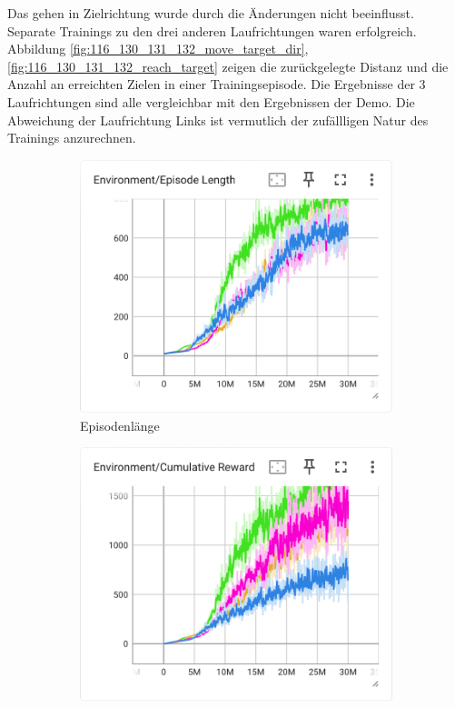 Das gehen in Zielrichtung wurde durch die Änderungen nicht beeinflusst. Separate Trainings zu den drei anderen Laufrichtungen waren erfolgreich. Abbildung \ref{fig:116_130_131_132_move_target_dir}, \ref{fig:116_130_131_132_reach_target} zeigen die zurückgelegte Distanz und die Anzahl an erreichten Zielen in einer Trainingsepisode. Die Ergebnisse der 3 Laufrichtungen sind alle vergleichbar mit den Ergebnissen der Demo. Die Abweichung der Laufrichtung Links ist vermutlich der zufällligen Natur des Trainings anzurechnen.

\begin{figure}[H]
  \centering  
  \begin{subfigure}{.49\textwidth}
      \centering  
      \includegraphics[width=\textwidth]{img/116_130_131_132_episode_length}
      \caption{Episodenlänge}
      \label{fig:116_130_131_132_episode_length}
    \end{subfigure}
    \begin{subfigure}{.49\textwidth}
      \centering  
      \includegraphics[width=\textwidth]{img/116_130_131_132_cumulative_reward}

\end{subfigure}
\end{figure}
